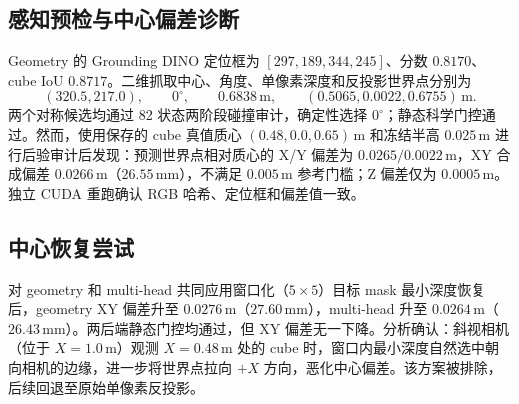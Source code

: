 \documentclass{l4proj}
\begin{document}
\begin{table}[htbp]
  \centering
  \caption{真值姿态分阶段控制链验证结果。每阶段只增加一种新能力，通过后才进入下一阶段。}
  \label{tab:truth-control-chain}
\end{table}

\subsection{感知预检与中心偏差诊断}
Geometry 的 Grounding DINO 定位框为 $[297,189,344,245]$、分数 $0.8170$、cube IoU $0.8717$。二维抓取中心、角度、单像素深度和反投影世界点分别为
\[
(320.5,217.0),\qquad 0^\circ,\qquad 0.6838\,\mathrm{m},\qquad
(0.5065,0.0022,0.6755)\,\mathrm{m}.
\]
两个对称候选均通过 82 状态两阶段碰撞审计，确定性选择 $0^\circ$；静态科学门控通过。然而，使用保存的 cube 真值质心 $(0.48,0.0,0.65)$\,m 和冻结半高 $0.025$\,m 进行后验审计后发现：预测世界点相对质心的 X/Y 偏差为 $0.0265/0.0022$\,m，XY 合成偏差 $0.0266$\,m（$26.55$\,mm），不满足 $0.005$\,m 参考门槛；Z 偏差仅为 $0.0005$\,m。独立 CUDA 重跑确认 RGB 哈希、定位框和偏差值一致。

\subsection{中心恢复尝试}
对 geometry 和 multi-head 共同应用窗口化（$5\times5$）目标 mask 最小深度恢复后，geometry XY 偏差升至 $0.0276$\,m（$27.60$\,mm），multi-head 升至 $0.0264$\,m（$26.43$\,mm）。两后端静态门控均通过，但 XY 偏差无一下降。分析确认：斜视相机（位于 $X=1.0$\,m）观测 $X=0.48$\,m 处的 cube 时，窗口内最小深度自然选中朝向相机的边缘，进一步将世界点拉向 $+X$ 方向，恶化中心偏差。该方案被排除，后续回退至原始单像素反投影。
\end{document}
